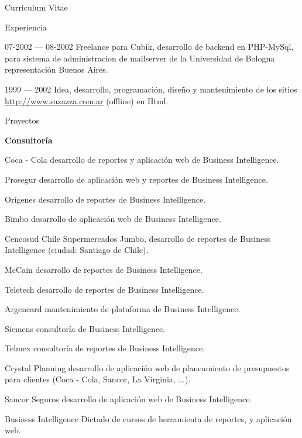 \documentclass[a4paper]{article}
\begin{document}
\begin{cv}{Curriculum Vitae}
\begin{cvlist}{Experiencia}
      \item[07-2002 --- 08-2002] Freelance para Cubik, desarrollo de backend en PHP-MySql, para sistema de administracion de mailserver de la Universidad de Bologna representación Buenos Aires.
      \item[1999 --- 2002] Idea, desarrollo, programación, diseño y mantenimiento de los sitios\\ \url{http://www.sazazza.com.ar} (offline) en Html.
    \end{cvlist}

    \begin{cvlist}{Proyectos}
      \item[\textbf{Consultoría}]
      \item[Coca - Cola] desarrollo de reportes y aplicación web de Business Intelligence.
      \item[Prosegur] desarrollo de aplicación web y reportes de Business Intelligence.
      \item[Orígenes] desarrollo de reportes de Business Intelligence.
      \item[Bimbo] desarrollo de aplicación web de Business Intelligence.
      \item[Cencosud Chile] Supermercados Jumbo, desarrollo de reportes de Business Intelligence (ciudad: Santiago de Chile).
      \item[McCain] desarrollo de reportes de Business Intelligence.
      \item[Teletech] desarrollo de reportes de Business Intelligence.
      \item[Argencard] mantenimiento de plataforma de Business Intelligence.
      \item[Siemens] consultoría de Business Intelligence.
      \item[Telmex] consultoría de reportes de Business Intelligence.
      \item[Crystal Planning] desarrollo de aplicación web de planeamiento de presupuestos para clientes
      (Coca - Cola, Sancor, La Virginia, ...).
      \item[Sancor Seguros] desarrollo de aplicación web de Business Intelligence.
      \item[Business Intelligence] Dictado de cursos de herramienta de reportes, y aplicación web.

      \newpage


\end{cvlist}
\end{cv}
\end{document}
